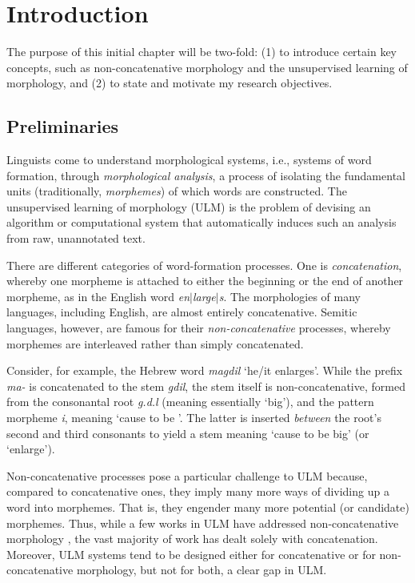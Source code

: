 \chapter{Introduction}

The purpose of this initial chapter will be two-fold: (1) to 
introduce certain key concepts, such as non-concatenative morphology 
and the unsupervised learning of morphology, 
and (2) to state and motivate my research objectives. 

\section{Preliminaries} 
Linguists come to understand morphological 
systems, i.e., systems of word formation, through 
\emph{morphological analysis}, a process of isolating the fundamental units
(traditionally, \emph{morphemes}) of which words are constructed. 
The unsupervised learning of morphology (ULM) is the problem of devising an 
algorithm or computational system that
automatically induces such an analysis from raw, unannotated text.

There are different categories of word-formation processes.
One is \emph{concatenation}, whereby one morpheme is attached 
to either the beginning or the end of another morpheme, as in the 
English word \textit{en}$|$\textit{large}$|$\textit{s}. 
The morphologies of many languages, including English, 
are almost entirely concatenative. Semitic languages, however, are 
famous for their \emph{non-concatenative} processes, whereby 
morphemes are interleaved rather than simply concatenated.

Consider, for example, the Hebrew word 
\textit{magdil} `he/it enlarges'. While the prefix \textit{ma-} is 
concatenated to the stem \textit{gdil}, the stem itself is 
non-concatenative, formed from the consonantal root \textit{g.d.l} 
(meaning essentially `big'), and the pattern morpheme \textit{i}, meaning 
`cause to be \uline{\hspace{0.7cm}}'. The latter is inserted 
\textit{between} the root's second and third consonants 
to yield a stem meaning `cause to be big' (or `enlarge').

Non-concatenative processes pose a particular challenge to 
ULM because, 
compared to concatenative ones, 
they imply many more ways of dividing up a word into morphemes. 
That is, they engender many more potential (or candidate) morphemes.   
Thus, while a few works in ULM have addressed non-concatenative 
morphology 
\citep[e.g.,][]{rodrigues-and-cavar:2005, botha:blunsom:13}, 
the vast majority 
of work has dealt solely with concatenation.
Moreover, ULM systems tend 
to be designed either for concatenative or for non-concatenative morphology, 
but not for both, a clear gap in ULM.

